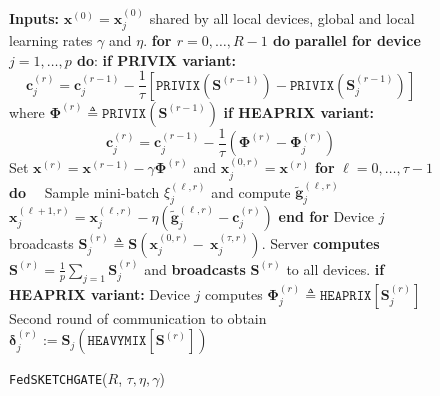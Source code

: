 \documentclass{article} %
\newcommand\DrawBox[3][]{%
  \begin{tikzpicture}[remember picture,overlay]
    \draw[overlay,fill=gray!30,#1] 
    ([xshift=10em,yshift=-0.4ex]{pic cs:#2}) 
    rectangle 
    ([xshift=-4pt,yshift=1.1ex]pic cs:#3);
  \end{tikzpicture}%
}
\newcommand\DrawBoxx[3][]{%
  \begin{tikzpicture}[remember picture,overlay]
    \draw[overlay,fill=gray!30,#1] 
    ([xshift=-8.0em,yshift=-1.0ex]{pic cs:#2}) 
    rectangle 
    ([xshift=50pt,yshift=-1.2ex]pic cs:#3);
  \end{tikzpicture}%
}
\begin{document}
\begin{figure}\vspace{-1.8cm}
\begin{minipage}{\linewidth}
\begin{algorithm}[H]
\caption{\texttt{FedSKETCHGATE}($R$, $\tau, \eta, \gamma$)}\label{Alg:PFLHet}
\begin{algorithmic}[1]
\STATE \textbf{Inputs:} $\boldsymbol{x}^{(0)}=\boldsymbol{x}^{(0)}_j$ shared by all local devices, global and local learning rates $\gamma$ and $\eta$.
\STATE \textbf{for $r=0, \ldots, R-1$ do}
\STATE   \textbf{parallel for device $j=1,\ldots,p$ do}:
\STATE  \hspace{0.02in} \textbf{if PRIVIX variant:} \label{line:cj_privix}
{\small$$\mathbf{c}_j^{(r)}=\mathbf{c}_j^{(r-1)}-\frac{1}{\tau}\left[{\texttt{PRIVIX}}\left(\mathbf{S}^{(r-1)}\right)-{\texttt{PRIVIX}}\left(\mathbf{S}^{(r-1)}_{j}\right)\right]$$} {\small where ${\mathbf{\Phi}}^{(r)}\triangleq \texttt{PRIVIX}(\mathbf{S}^{(r-1)})$}
\vspace{0.1cm}
\STATE  \hspace{0.02in} \textbf{if HEAPRIX variant:} 
{\small $$\mathbf{c}_j^{(r)}=\mathbf{c}_j^{(r-1)}-\frac{1}{\tau}\left(\mathbf{\Phi}^{(r)}-\mathbf{\Phi}^{(r)}_j\right)$$}
\STATE  Set $\boldsymbol{x}^{(r)}=\boldsymbol{x}^{(r-1)}-\gamma\mathbf{\Phi}^{(r)}$ and $\boldsymbol{x}_j^{(0,r)}=\boldsymbol{x}^{(r)}$ 
\STATE \hspace{0.02in} \textbf{for} $\ell=0,\ldots,\tau-1$ \textbf{do}
\STATE  $\quad  $Sample mini-batch $\xi_j^{(\ell,r)}$ and compute $\tilde{\mathbf{g}}_{j}^{(\ell,r)}$
\STATE $\quad  $$\boldsymbol{x}^{(\ell+1,r)}_{j}=\boldsymbol{x}^{(\ell,r)}_j-\eta \left( \tilde{\mathbf{g}}_{j}^{(\ell,r)}-\mathbf{c}_j^{(r)}\right)$ \label{eq:update-rule-alg-heter1}
\STATE \hspace{0.05in}\textbf{end for}
\STATE Device $j$ broadcasts $\mathbf{S}^{(r)}_{j}\triangleq\mathbf{S}\left(\boldsymbol{x}_j^{(0,r)}-~{\boldsymbol{x}}_{j}^{(\tau,r)}\right)$.
\STATE Server \textbf{computes} $ {\mathbf{S}}^{(r)}=\frac{1}{p}\sum_{j=1}\mathbf{S}^{(r)}_{j}$ and  \textbf{broadcasts} ${\mathbf{S}}^{(r)}$ to all devices.
\vspace{0.1cm}
\STATE  \hspace{0.04in}\textbf{if HEAPRIX variant:} 
\STATE  Device $j$ computes $\mathbf{\Phi}^{(r)}_j\triangleq \texttt{HEAPRIX}[\mathbf{S}_j^{(r)}]$
\STATE  Second round of communication to obtain $\mathbf{\delta}_j^{(r)} :=  \mathbf{S}_j\left(\texttt{HEAVYMIX}[\mathbf{S}^{(r)}]\right)$  \label{line:tildeS}
$$
\end{algorithmic}
\end{algorithm}
\end{minipage}
\end{figure}
\end{document}
